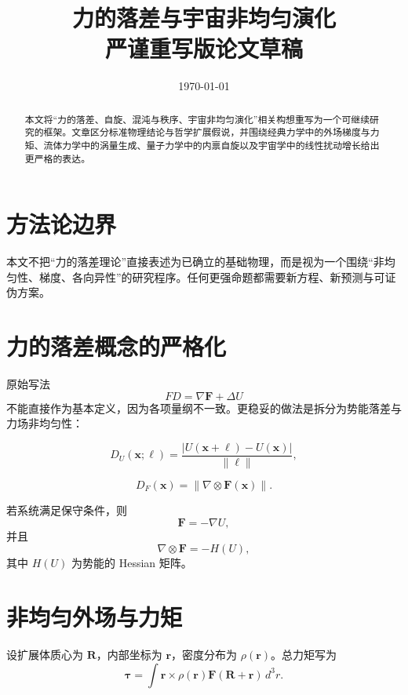 \documentclass[12pt,a4paper]{ctexart}
\title{力的落差与宇宙非均匀演化\\严谨重写版论文草稿}
\author{}
\date{\today}
\begin{document}
\maketitle

\begin{abstract}
本文将“力的落差、自旋、混沌与秩序、宇宙非均匀演化”相关构想重写为一个可继续研究的框架。文章区分标准物理结论与哲学扩展假说，并围绕经典力学中的外场梯度与力矩、流体力学中的涡量生成、量子力学中的内禀自旋以及宇宙学中的线性扰动增长给出更严格的表达。
\end{abstract}

\section{方法论边界}

本文不把“力的落差理论”直接表述为已确立的基础物理，而是视为一个围绕“非均匀性、梯度、各向异性”的研究程序。任何更强命题都需要新方程、新预测与可证伪方案。

\section{力的落差概念的严格化}

原始写法
\begin{equation}
FD = \nabla \bm{F} + \Delta U
\end{equation}
不能直接作为基本定义，因为各项量纲不一致。更稳妥的做法是拆分为势能落差与力场非均匀性：

\begin{equation}
D_U(\bm{x};\ell)=\frac{|U(\bm{x}+\ell)-U(\bm{x})|}{\|\ell\|},
\end{equation}

\begin{equation}
D_F(\bm{x})=\|\nabla\otimes\bm{F}(\bm{x})\|.
\end{equation}

若系统满足保守条件，则
\begin{equation}
\bm{F}=-\nabla U,
\end{equation}
并且
\begin{equation}
\nabla\otimes\bm{F}=-H(U),
\end{equation}
其中 $H(U)$ 为势能的 Hessian 矩阵。

\section{非均匀外场与力矩}

设扩展体质心为 $\bm{R}$，内部坐标为 $\bm{r}$，密度分布为 $\rho(\bm{r})$。总力矩写为
\begin{equation}
\bm{\tau}=\int \bm{r}\times \rho(\bm{r})\bm{F}(\bm{R}+\bm{r})\,d^3r.
\end{equation}
\end{document}
